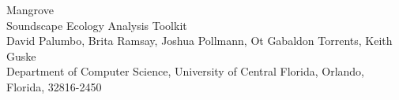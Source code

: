 \begin{center}
  {\LARGE Mangrove}\\
  \vspace{5mm} %
  {\Large Soundscape Ecology Analysis Toolkit}\\
  \vspace{5mm} %
  {\fontsize{12}{14} David Palumbo, Brita Ramsay, Joshua Pollmann, Ot Gabaldon Torrents, Keith Guske}\\
  \vspace{5mm} %
  {\fontsize{12}{14} Department of Computer Science, University of Central Florida, Orlando, Florida, 32816-2450}\\
\end{center}
